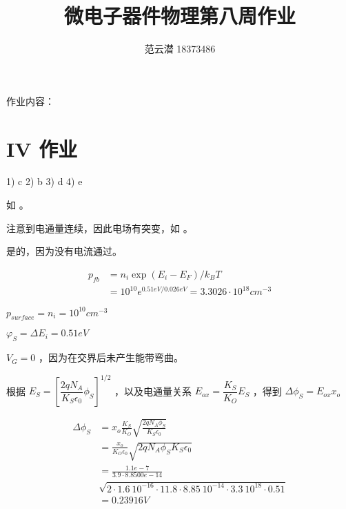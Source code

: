 \documentclass[lang=cn,11pt,a4paper,cite=authoryear]{elegantpaper}
\title{微电子器件物理\quad 第八周作业}
\author{范云潜 18373486}
\institute{微电子学院 184111 班}
\date{\zhtoday}
\begin{document}
\maketitle

作业内容：

\tableofcontents

\part{IV 作业}


1) c 2) b 3) d 4) e 



如  。



注意到电通量连续，因此电场有突变，如  。



是的，因为没有电流通过。




\[\begin{aligned}
    p_{fb} &= n_i \exp{(E_i-E_F)/k_B T}\\
    &= 10^{10} e^{0.51 eV / 0.026 eV} = 3.3026 \cdot 10^{18}cm^{-3} 
\end{aligned}\]


\(p_{surface} = n_i = 10^{10} cm^{-3}\)


\(\varphi_S = \Delta E_i = 0.51 eV\) 



\(V_G = 0\) ，因为在交界后未产生能带弯曲。


根据 \(E_S = \left[\dfrac{2 q N_A}{K_S \epsilon_0} \phi_S\right]^{1/2}\) ，以及电通量关系 \(E_{ox} = \dfrac{K_S}{K_O}E_S\) ，得到 \(\Delta \phi_S = E_{ox} x_o \)

\[\begin{aligned}
    \Delta \phi_S &= x_o \frac{K_S}{K_O} \sqrt{\frac{2qN_A\phi_S}{K_S \epsilon_0}} \\
    &= \frac{x_o}{K_O \epsilon_0} \sqrt{2q N_A \phi_S K_S \epsilon_0} \\
    &= \frac{1.1e-7}{3.9 \cdot 8.8500e-14} \\
    &\sqrt{2 \cdot 1.6\: 10^{-16} \cdot 11.8 \cdot 8.85\: 10^{-14} \cdot 3.3 \: 10^{18} \cdot 0.51} \\
    &=   0.23916 V
\end{aligned}\]
\end{document}
